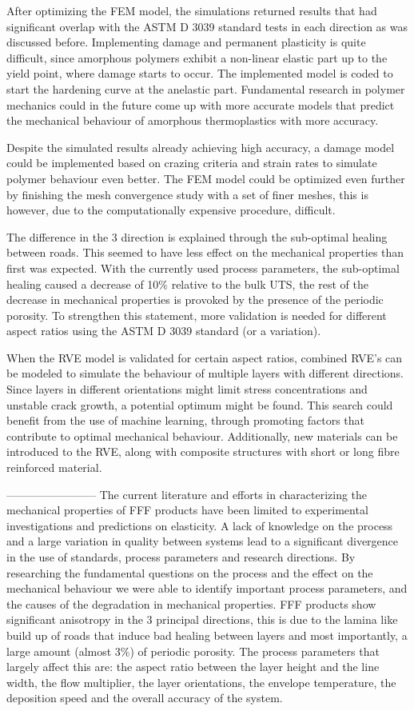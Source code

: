 After optimizing the FEM model, the simulations returned results that had significant overlap with the ASTM D 3039 standard tests in each direction as was discussed before. Implementing damage and permanent plasticity is quite difficult, since amorphous polymers exhibit a non-linear elastic part up to the yield point, where damage starts to occur. The implemented model is coded to start the hardening curve at the anelastic part. Fundamental research in polymer mechanics could in the future come up with more accurate models that predict the mechanical behaviour of amorphous thermoplastics with more accuracy. 

Despite the simulated results already achieving high accuracy, a damage model could be implemented based on crazing criteria and strain rates to simulate polymer behaviour even better. The FEM model could be optimized even further by finishing the mesh convergence study with a set of finer meshes, this is however, due to the computationally expensive procedure, difficult.

 The difference in the 3 direction is explained through the sub-optimal healing between roads. This seemed to have less effect on the mechanical properties than first was expected. With the currently used process parameters, the sub-optimal healing caused a decrease of 10\% relative to the bulk UTS, the rest of the decrease in mechanical properties is provoked by the presence of the periodic porosity. To strengthen this statement, more validation is needed for different aspect ratios using the ASTM D 3039 standard (or a variation).  


When the RVE model is validated for certain aspect ratios, combined RVE's can be modeled to simulate the behaviour of multiple layers with different directions. Since layers in different orientations might limit stress concentrations and unstable crack growth, a potential optimum might be found. This search could benefit from the use of machine learning, through promoting factors that contribute to optimal mechanical behaviour. Additionally, new materials can be introduced to the RVE, along with composite structures with short or long fibre reinforced material.  

------------------------
The current literature and efforts in characterizing the mechanical properties of FFF products have been limited to experimental investigations and predictions on elasticity. A lack of knowledge on the process and a large variation in quality between systems lead to a significant divergence in the use of standards, process parameters and research directions. By researching the fundamental questions on the process and the effect on the mechanical behaviour we were able to identify important process parameters, and the causes of the degradation in mechanical properties. FFF products show significant anisotropy in the 3 principal directions, this is due to the lamina like build up of roads that induce bad healing between layers and most importantly, a large amount (almost 3\%) of periodic porosity. The process parameters that largely affect this are: the aspect ratio between the layer height and the line width, the flow multiplier, the layer orientations, the envelope temperature, the deposition speed and the overall accuracy of the system.

